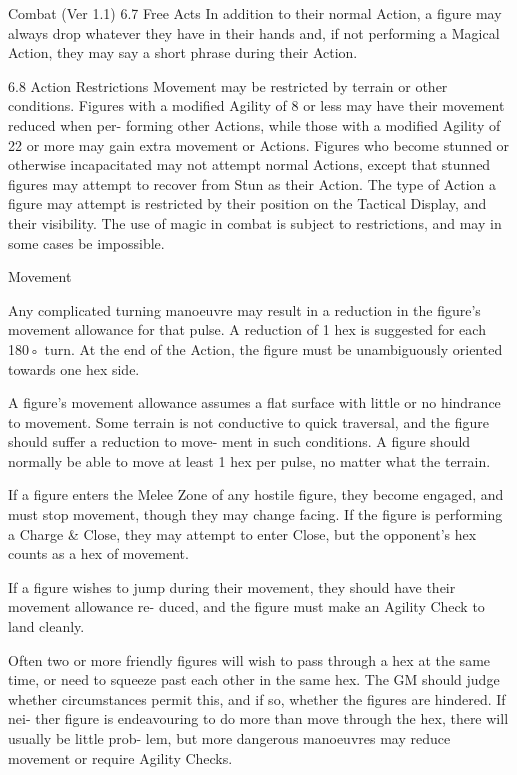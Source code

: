 \begin{Chapter}{Combat (Ver 1.1)}
6.7 Free Acts 
In  addition  to  their  normal  Action,  a  figure  may 
always drop whatever they have in their hands and, 
if not performing a Magical Action, they may say a 
short phrase during their Action. 

6.8 Action Restrictions 
Movement  may  be  restricted  by  terrain  or  other 
conditions. Figures with a modified Agility of 8 or 
less  may  have  their  movement  reduced  when  per-
forming other Actions, while those with a modified 
Agility of 22 or more may gain extra movement or 
Actions. Figures who become stunned or otherwise 
incapacitated  may  not  attempt  normal  Actions, 
except that stunned figures may attempt to recover 
from  Stun  as  their  Action.  The  type  of  Action  a 
figure may attempt is restricted by their position on 
the Tactical Display, and their visibility. The use of 
magic in combat is subject to restrictions, and may 
in some cases be impossible. 

Movement 

Any complicated turning manoeuvre  may result in 
a reduction in the figure’s movement allowance for 
that  pulse.  A  reduction  of  1  hex  is  suggested  for 
each 180◦ turn. At the end of the Action, the figure 
must  be  unambiguously  oriented  towards  one  hex 
side. 

A  figure’s  movement  allowance  assumes  a  flat 
surface  with  little  or  no  hindrance  to  movement. 
Some  terrain  is  not  conductive  to  quick  traversal, 
and  the  figure  should  suffer  a  reduction  to  move-
ment in such conditions. A figure should normally 
be able to move at least 1 hex per pulse, no matter 
what the terrain. 

If  a  figure  enters  the  Melee  Zone  of  any  hostile 
figure,  they  become  engaged,  and  must  stop 
movement,  though  they  may  change  facing.  If  the 
figure  is  performing  a  Charge  \&  Close,  they  may 
attempt  to  enter  Close,  but  the  opponent’s  hex 
counts as a hex of movement. 

If  a  figure  wishes  to  jump during  their  movement, 
they  should  have  their  movement  allowance  re-
duced, and the figure must make an Agility Check 
to land cleanly. 

Often  two  or  more  friendly  figures  will  wish  to 
pass  through  a  hex  at  the  same  time,  or  need  to 
squeeze  past  each  other  in the  same hex.  The  GM 
should  judge  whether  circumstances  permit  this, 
and if  so,  whether  the  figures  are  hindered.  If  nei-
ther  figure  is  endeavouring  to  do  more  than  move 
through  the  hex,  there  will  usually  be  little  prob-
lem,  but  more  dangerous  manoeuvres  may  reduce 
movement or require Agility Checks. 


\end{Chapter}

